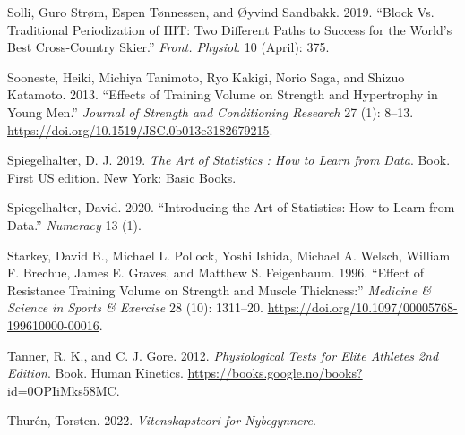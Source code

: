 \documentclass[
  letterpaper,
  DIV=11,
  numbers=noendperiod]{scrreprt}
\newlength{\cslhangindent}
\newenvironment{CSLReferences}[2] %
 {\begin{list}{}{%
  \setlength{\itemindent}{0pt}
  \setlength{\leftmargin}{0pt}
  \setlength{\parsep}{0pt}
  \ifodd #1
   \setlength{\leftmargin}{\cslhangindent}
   \setlength{\itemindent}{-1\cslhangindent}
  \fi
  \setlength{\itemsep}{#2\baselineskip}}}
 {\end{list}}
\begin{document}
\begin{CSLReferences}{1}{0}
Solli, Guro Strøm, Espen Tønnessen, and Øyvind Sandbakk. 2019. {``Block
Vs. Traditional Periodization of {HIT}: Two Different Paths to Success
for the World's Best Cross-Country Skier.''} \emph{Front. Physiol.} 10
(April): 375.

Sooneste, Heiki, Michiya Tanimoto, Ryo Kakigi, Norio Saga, and Shizuo
Katamoto. 2013. {``Effects of Training Volume on Strength and
Hypertrophy in Young Men.''} \emph{Journal of Strength and Conditioning
Research} 27 (1): 8--13.
\url{https://doi.org/10.1519/JSC.0b013e3182679215}.

Spiegelhalter, D. J. 2019. \emph{The Art of Statistics : How to Learn
from Data}. Book. First US edition. New York: Basic Books.

Spiegelhalter, David. 2020. {``Introducing the Art of Statistics: How to
Learn from Data.''} \emph{Numeracy} 13 (1).

Starkey, David B., Michael L. Pollock, Yoshi Ishida, Michael A. Welsch,
William F. Brechue, James E. Graves, and Matthew S. Feigenbaum. 1996.
{``Effect of Resistance Training Volume on Strength and Muscle
Thickness:''} \emph{Medicine \& Science in Sports \& Exercise} 28 (10):
1311--20. \url{https://doi.org/10.1097/00005768-199610000-00016}.

Tanner, R. K., and C. J. Gore. 2012. \emph{Physiological Tests for Elite
Athletes 2nd Edition}. Book. Human Kinetics.
\url{https://books.google.no/books?id=0OPIiMks58MC}.

Thurén, Torsten. 2022. \emph{Vitenskapsteori for Nybegynnere}.

\end{CSLReferences}
\end{document}
